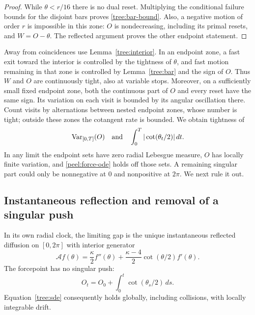 \begin{proof}
While $\theta<r/16$ there is no dual reset.  Multiplying the conditional
failure bounds for the disjoint bars proves \eqref{tree:bar-bound}.
Also, a negative motion of order $r$ is impossible in this zone:
$O$ is nondecreasing, including its primal resets, and $W=O-\theta$.
The reflected argument proves the other endpoint statement.
\end{proof}



Away from coincidences use Lemma~\ref{tree:interior}.  In an endpoint
zone, a fast exit toward the interior is controlled by the tightness
of $\theta$, and fast motion remaining in that zone is controlled by
Lemma~\ref{tree:bar} and the sign of $O$.  Thus $W$ and $O$ are
continuously tight, also at variable stops.  Moreover, on a sufficiently
small fixed endpoint zone, both the continuous part of $O$ and every
reset have the same sign.  Its variation on each visit is bounded by
its angular oscillation there.  Count visits by alternations between
nested endpoint zones, whose number is tight; outside these zones the
cotangent rate is bounded.  We obtain tightness of
\begin{equation}\label{tree:variation}
 \operatorname{Var}_{[0,T]}(O)
 \quad\hbox{and}\quad
 \int_0^T|\cot(\theta_t/2)|\,dt.
\end{equation}
In any limit the endpoint sets have zero radial Lebesgue measure,
$O$ has locally finite variation, and \eqref{peel:force-ode} holds off
those sets.  A remaining singular part could only be nonnegative at
$0$ and nonpositive at $2\pi$.  We next rule it out.

\subsection{Instantaneous reflection and removal of a singular push}
\label{tree:endpoints}

\begin{proposition}
\label{tree:reflection}
In its own radial clock, the limiting gap is the unique instantaneous
reflected diffusion on $[0,2\pi]$ with interior generator
\begin{equation}\label{tree:generator}
 \mathcal A f(\theta)=\frac\kappa2 f''(\theta)
       +\frac{\kappa-4}{2}\cot(\theta/2)f'(\theta).
\end{equation}
The forcepoint has no singular push:
\begin{equation}\label{tree:no-push}
 O_t=O_0+\int_0^t\cot(\theta_s/2)\,ds.
\end{equation}
Equation~\eqref{tree:sde} consequently holds globally, including
collisions, with locally integrable drift.
\end{proposition}

